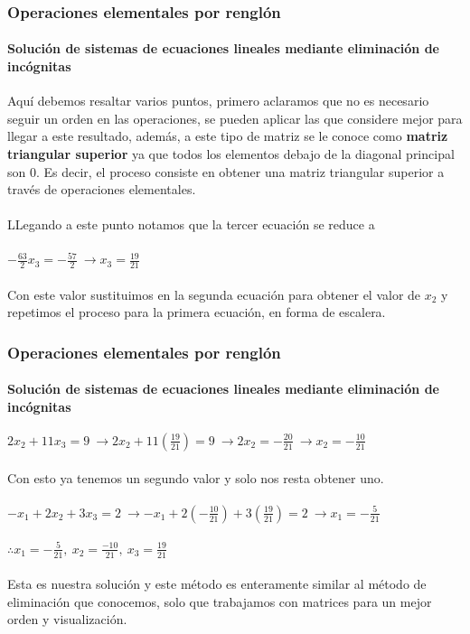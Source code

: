 \documentclass[11pt]{beamer}
\begin{document}
\begin{frame}
\frametitle{Operaciones elementales por renglón}
\framesubtitle{Solución de sistemas de ecuaciones lineales mediante eliminación de incógnitas}
Aquí debemos resaltar varios puntos, primero aclaramos que no es necesario seguir un orden en las operaciones, se pueden aplicar las que considere mejor para llegar a este resultado, además, a este tipo de matriz se le conoce como \textbf{matriz triangular  superior} ya que todos los elementos debajo de la diagonal principal son 0. Es decir, el proceso consiste en obtener una matriz triangular superior a través de operaciones elementales.\\ \hspace{0cm} \\
LLegando a este punto notamos que la tercer ecuación se reduce a \\ \hspace{0cm} \\
$-\frac{63}{2}x_3 = -\frac{57}{2}~\rightarrow x_3 = \frac{19}{21}$ \\ \hspace{0cm} \\
Con este valor sustituimos en la segunda ecuación para obtener el valor de $x_2$ y repetimos el proceso para la primera ecuación, en forma de escalera.
\end{frame}

\begin{frame}
\frametitle{Operaciones elementales por renglón}
\framesubtitle{Solución de sistemas de ecuaciones lineales mediante eliminación de incógnitas}
$2x_2 + 11x_3 = 9 ~\rightarrow 2x_2 + 11(\frac{19}{21}) = 9~\rightarrow 2x_2 = -\frac{20}{21} ~ \rightarrow x_2 = -\frac{10}{21}$\\ \hspace{0cm} \\
Con esto ya tenemos un segundo valor y solo nos resta obtener uno.\\ \hspace{0cm} \\
$-x_1 + 2x_2 + 3x_3 = 2 ~\rightarrow -x_1 + 2(-\frac{10}{21}) + 3(\frac{19}{21}) = 2 ~\rightarrow x_1 = -\frac{5}{21}$\\ \hspace{0cm} \\
$\therefore x_1 = -\frac{5}{21},~ x_2 = \frac{-10}{21},~ x_3 = \frac{19}{21}$\\ \hspace{0cm} \\
Esta es nuestra solución y este método es enteramente similar al método de eliminación que conocemos, solo que trabajamos con matrices para un mejor orden y visualización.
\end{frame}
\end{document}
